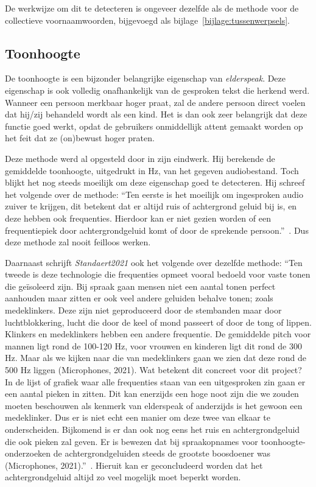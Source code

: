 De werkwijze om dit te detecteren is ongeveer dezelfde als de methode voor de collectieve voornaamwoorden, bijgevoegd als bijlage~\ref{bijlage:tussenwerpsels}.

\subsection{Toonhoogte}
De toonhoogte is een bijzonder belangrijke eigenschap van \textit{elderspeak}. Deze eigenschap is ook volledig onafhankelijk van de gesproken tekst die herkend werd. Wanneer een persoon merkbaar hoger praat, zal de andere persoon direct voelen dat hij/zij behandeld wordt als een kind. Het is dan ook zeer belangrijk dat deze functie goed werkt, opdat de gebruikers onmiddellijk attent gemaakt worden op het feit dat ze (on)bewust hoger praten.

Deze methode werd al opgesteld door \textcite{Standaert2021} in zijn eindwerk. Hij berekende de gemiddelde toonhoogte, uitgedrukt in Hz, van het gegeven audiobestand. Toch blijkt het nog steeds moeilijk om deze eigenschap goed te detecteren. Hij schreef het volgende over de methode:
``Ten eerste is het moeilijk om ingesproken audio zuiver te krijgen, dit betekent dat er altijd
ruis of achtergrond geluid bij is, en deze hebben ook frequenties. Hierdoor kan er niet
gezien worden of een frequentiepiek door achtergrondgeluid komt of door de sprekende
persoon.''~\autocite{Standaert2021}. Dus deze methode zal nooit feilloos werken.

Daarnaast schrijft \textit{Standaert2021} ook het volgende over dezelfde methode:
``Ten tweede is deze technologie die frequenties opmeet vooral bedoeld voor vaste tonen
die geïsoleerd zijn. Bij spraak gaan mensen niet een aantal tonen perfect aanhouden maar
zitten er ook veel andere geluiden behalve tonen; zoals medeklinkers. Deze zijn niet
geproduceerd door de stembanden maar door luchtblokkering, lucht die door de keel of
mond passeert of door de tong of lippen. Klinkers en medeklinkers hebben een andere
frequentie. De gemiddelde pitch voor mannen ligt rond de 100-120 Hz, voor vrouwen en
kinderen ligt dit rond de 300 Hz. Maar als we kijken naar die van medeklinkers gaan we
zien dat deze rond de 500 Hz liggen (Microphones, 2021). Wat betekent dit concreet voor
dit project? In de lijst of grafiek waar alle frequenties staan van een uitgesproken zin gaan
er een aantal pieken in zitten. Dit kan enerzijds een hoge noot zijn die we zouden moeten
beschouwen als kenmerk van elderspeak of anderzijds is het gewoon een medeklinker. Dus
er is niet echt een manier om deze twee van elkaar te onderscheiden. Bijkomend is er dan
ook nog eens het ruis en achtergrondgeluid die ook pieken zal geven. Er is bewezen dat bij
spraakopnames voor toonhoogte-onderzoeken de achtergrondgeluiden steeds de grootste
boosdoener was (Microphones, 2021).''~\autocite{Standaert2021}. Hieruit kan er geconcludeerd worden dat het achtergrondgeluid altijd zo veel mogelijk moet beperkt worden.

